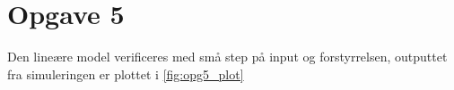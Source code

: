 \section{Opgave 5}
Den lineære model verificeres med små step på input og forstyrrelsen, outputtet
fra simuleringen er plottet i \ref{fig:opg5_plot}


